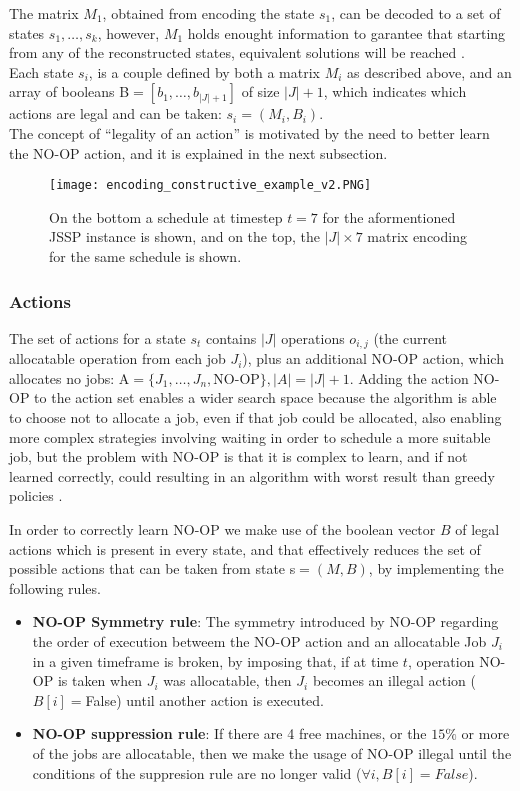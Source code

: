 \documentclass[12pt]{article}
\begin{document}
\medbreak
The matrix $M_1$, obtained from encoding the state $s_1$, can be decoded to a set of states ${s_1,\dots,s_k}$, however, $M_1$ holds enought information to garantee 
that starting from any of the reconstructed states, equivalent solutions will be reached \cite{pierre_constructive_approach}.\\
Each state $s_i$, is a couple defined by both a matrix $M_i$ as described above, and an array of booleans B$={[b_1,\dots,b_{|J|+1}]}$ of size $|J|+1$, which indicates which actions are legal and can be taken: $s_i = (M_i, B_i)$.\\
The concept of ``legality of an action'' is motivated by the need to better learn the NO-OP action, and it is explained in the next subsection.

\begin{figure}[H]
    \centering
    \texttt{[image: encoding\_constructive\_example\_v2.PNG]}
    \caption{On the bottom a schedule at timestep $t=7$ for the aformentioned JSSP instance is shown, and on the top, the $|J|\times7$ matrix encoding for the same schedule is shown.}
    \label{img:encoding_constructive_example}
\end{figure}

\subsubsection{Actions}
The set of actions for a state $s_t$ contains $|J|$ operations $o_{i,j}$ (the current allocatable operation from each job $J_i$), plus an additional NO-OP action, which allocates no jobs: A$=\{J_1,\dots,J_n,$NO-OP$\}, |A|=|J|+1$.
Adding the action NO-OP to the action set enables a wider search space because the algorithm is able to choose not to allocate a job, even if that job could be allocated, 
also enabling more complex strategies involving waiting in order to schedule a more suitable job, but the problem with NO-OP is that it is complex to learn, and if not learned correctly, could resulting in an 
 algorithm with worst result than greedy policies \cite{pierre_constructive_approach}.
 
 \medbreak
 In order to correctly learn NO-OP we make use of the boolean vector $B$ of legal actions which is present in every state, and that effectively reduces the set of possible actions that can be taken from state s$=(M,B)$, by implementing the following rules.
\begin{itemize}
    \item \textbf{NO-OP Symmetry rule}: The symmetry introduced by NO-OP regarding the order of execution betweem the NO-OP action and an allocatable Job $J_i$ in a given timeframe is broken, by imposing that, if at time $t$, operation NO-OP is taken when $J_i$ was allocatable, then $J_i$ becomes an illegal action ($B[i]=$False) until another action is executed.
    \item \textbf{NO-OP suppression rule}: If there are 4 free machines, or the $15\%$ or more of the jobs are allocatable, then we make the usage of NO-OP illegal until the conditions of the suppresion rule are no longer valid ($\forall i, B[i]=\mathit{False}$).
\end{itemize}
\end{document}
